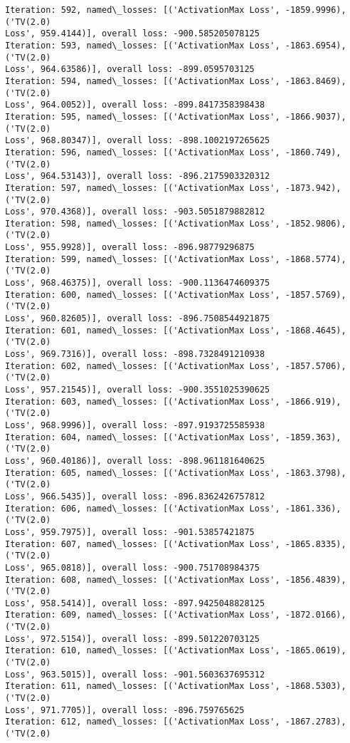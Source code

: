\documentclass[10pt]{article}
\begin{document}
\begin{Verbatim}[commandchars=\\\{\}]
Iteration: 592, named\_losses: [('ActivationMax Loss', -1859.9996), ('TV(2.0)
Loss', 959.4144)], overall loss: -900.585205078125
Iteration: 593, named\_losses: [('ActivationMax Loss', -1863.6954), ('TV(2.0)
Loss', 964.63586)], overall loss: -899.0595703125
Iteration: 594, named\_losses: [('ActivationMax Loss', -1863.8469), ('TV(2.0)
Loss', 964.0052)], overall loss: -899.8417358398438
Iteration: 595, named\_losses: [('ActivationMax Loss', -1866.9037), ('TV(2.0)
Loss', 968.80347)], overall loss: -898.1002197265625
Iteration: 596, named\_losses: [('ActivationMax Loss', -1860.749), ('TV(2.0)
Loss', 964.53143)], overall loss: -896.2175903320312
Iteration: 597, named\_losses: [('ActivationMax Loss', -1873.942), ('TV(2.0)
Loss', 970.4368)], overall loss: -903.5051879882812
Iteration: 598, named\_losses: [('ActivationMax Loss', -1852.9806), ('TV(2.0)
Loss', 955.9928)], overall loss: -896.98779296875
Iteration: 599, named\_losses: [('ActivationMax Loss', -1868.5774), ('TV(2.0)
Loss', 968.46375)], overall loss: -900.1136474609375
Iteration: 600, named\_losses: [('ActivationMax Loss', -1857.5769), ('TV(2.0)
Loss', 960.82605)], overall loss: -896.7508544921875
Iteration: 601, named\_losses: [('ActivationMax Loss', -1868.4645), ('TV(2.0)
Loss', 969.7316)], overall loss: -898.7328491210938
Iteration: 602, named\_losses: [('ActivationMax Loss', -1857.5706), ('TV(2.0)
Loss', 957.21545)], overall loss: -900.3551025390625
Iteration: 603, named\_losses: [('ActivationMax Loss', -1866.919), ('TV(2.0)
Loss', 968.9996)], overall loss: -897.9193725585938
Iteration: 604, named\_losses: [('ActivationMax Loss', -1859.363), ('TV(2.0)
Loss', 960.40186)], overall loss: -898.961181640625
Iteration: 605, named\_losses: [('ActivationMax Loss', -1863.3798), ('TV(2.0)
Loss', 966.5435)], overall loss: -896.8362426757812
Iteration: 606, named\_losses: [('ActivationMax Loss', -1861.336), ('TV(2.0)
Loss', 959.7975)], overall loss: -901.53857421875
Iteration: 607, named\_losses: [('ActivationMax Loss', -1865.8335), ('TV(2.0)
Loss', 965.0818)], overall loss: -900.751708984375
Iteration: 608, named\_losses: [('ActivationMax Loss', -1856.4839), ('TV(2.0)
Loss', 958.5414)], overall loss: -897.9425048828125
Iteration: 609, named\_losses: [('ActivationMax Loss', -1872.0166), ('TV(2.0)
Loss', 972.5154)], overall loss: -899.501220703125
Iteration: 610, named\_losses: [('ActivationMax Loss', -1865.0619), ('TV(2.0)
Loss', 963.5015)], overall loss: -901.5603637695312
Iteration: 611, named\_losses: [('ActivationMax Loss', -1868.5303), ('TV(2.0)
Loss', 971.7705)], overall loss: -896.759765625
Iteration: 612, named\_losses: [('ActivationMax Loss', -1867.2783), ('TV(2.0)

\end{Verbatim}
\end{document}
